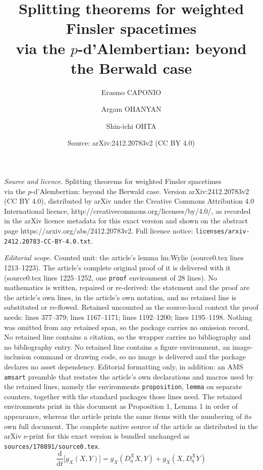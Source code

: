 \documentclass[10pt,a4paper]{amsart}
\title{Splitting theorems for weighted Finsler spacetimes\\ via the $p$-d'Alembertian: beyond the Berwald case}
\author{Erasmo CAPONIO \and Argam OHANYAN \and Shin-ichi OHTA}
\date{Source: arXiv:2412.20783v2 (CC BY 4.0)}
\newcommand{\dd}{\mathrm{d}}
\begin{document}
\maketitle

\noindent\emph{Source and licence.} Splitting theorems for weighted Finsler spacetimes\\ via the $p$-d'Alembertian: beyond the Berwald case. Version arXiv:2412.20783v2 (CC BY 4.0), distributed by arXiv under the Creative Commons Attribution 4.0 International licence, http://creativecommons.org/licenses/by/4.0/, as recorded in the arXiv licence metadata for this exact version and shown on the abstract page https://arxiv.org/abs/2412.20783v2. Full licence notice: \texttt{licenses/arxiv-2412.20783-CC-BY-4.0.txt}.\par\smallskip

\noindent\textit{Editorial scope.} Counted unit: the article's lemma lm:Wylie (source0.tex lines 1213--1223). The article's complete original proof of it is delivered with it (source0.tex lines 1225--1252, one \texttt{proof} environment of 28 lines). No mathematics is written, repaired or re-derived: the statement and the proof are the article's own lines, in the article's own notation, and no retained line is substituted or re-flowed.  Retained uncounted as the source-local context the proof needs: lines 377--379; lines 1167--1171; lines 1192--1200; lines 1195--1198.  Nothing was omitted from any retained span, so the package carries no omission record.  No retained line contains a citation, so the wrapper carries no bibliography and no bibliography entry.  No retained line contains a figure environment, an image-inclusion command or drawing code, so no image is delivered and the package declares no asset dependency.  Editorial formatting only, in addition: an AMS \texttt{amsart} preamble that restates the article's own declarations and macros used by the retained lines, namely the environments \texttt{proposition}, \texttt{lemma} on separate counters, together with the standard packages those lines need.  The retained environments print in this document as Proposition 1, Lemma 1 in order of appearance, whereas the article prints the same items with the numbering of its own full document.  The complete native source of the article as distributed in the arXiv e-print for this exact version is bundled unchanged as \texttt{sources/170891/source0.tex}.
\begin{equation}\label{eq:g_X}
\frac{\dd}{\dd t}\bigl[ g_X(X,Y) \bigr] =g_X(D^X_{\dot{\eta}}X,Y) +g_X(X,D^X_{\dot{\eta}}Y)
\end{equation}
\end{document}
